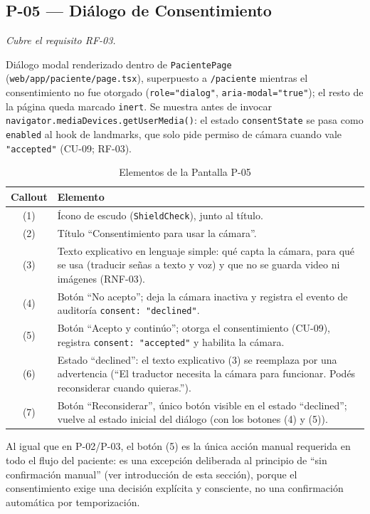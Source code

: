 \subsection{P-05 --- Diálogo de Consentimiento}
\textit{Cubre el requisito RF-03.}

Diálogo modal renderizado dentro de \texttt{PacientePage}
(\texttt{web/app/paciente/page.tsx}), superpuesto a \texttt{/paciente}
mientras el consentimiento no fue otorgado (\texttt{role="dialog"},
\texttt{aria-modal="true"}); el resto de la página queda marcado
\texttt{inert}. Se muestra antes de invocar
\texttt{navigator.mediaDevices.getUserMedia()}: el estado
\texttt{consentState} se pasa como \texttt{enabled} al hook de landmarks,
que solo pide permiso de cámara cuando vale \texttt{"accepted"} (CU-09;
RF-03).


\begin{table}[H]
    \centering
    \caption{Elementos de la Pantalla P-05}
    \label{tab:mock-p05}
    \begin{tabularx}{\textwidth}{c X}
        \toprule
        \textbf{Callout} & \textbf{Elemento} \\
        \midrule
        (1) & Ícono de escudo (\texttt{ShieldCheck}), junto al título. \\
        (2) & Título ``Consentimiento para usar la cámara''. \\
        (3) & Texto explicativo en lenguaje simple: qué capta la cámara,
        para qué se usa (traducir señas a texto y voz) y que no se guarda
        video ni imágenes (RNF-03). \\
        (4) & Botón ``No acepto''; deja la cámara inactiva y registra el
        evento de auditoría \texttt{consent: "declined"}. \\
        (5) & Botón ``Acepto y continúo''; otorga el consentimiento
        (CU-09), registra \texttt{consent: "accepted"} y habilita la
        cámara. \\
        (6) & Estado ``declined'': el texto explicativo (3) se reemplaza
        por una advertencia (``El traductor necesita la cámara para
        funcionar. Podés reconsiderar cuando quieras.''). \\
        (7) & Botón ``Reconsiderar'', único botón visible en el estado
        ``declined''; vuelve al estado inicial del diálogo (con los
        botones (4) y (5)). \\
        \bottomrule
    \end{tabularx}
\end{table}

Al igual que en P-02/P-03, el botón (5) es la única acción manual
requerida en todo el flujo del paciente: es una excepción deliberada al
principio de ``sin confirmación manual'' (ver introducción de esta
sección), porque el consentimiento exige una decisión explícita y
consciente, no una confirmación automática por temporización.
